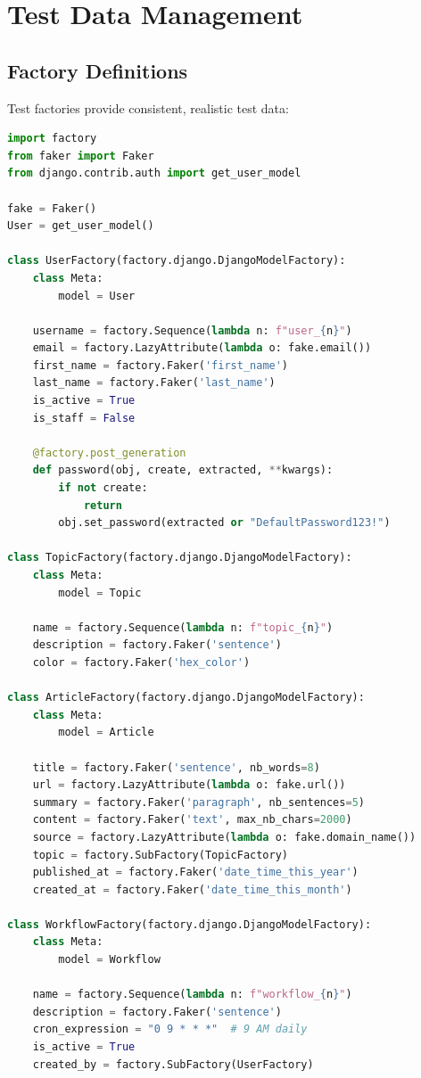 \documentclass{report}
\begin{document}
\chapter{Test Data Management}

\section{Factory Definitions}

Test factories provide consistent, realistic test data:

\begin{lstlisting}[language=Python, caption=Comprehensive factory definitions]
import factory
from faker import Faker
from django.contrib.auth import get_user_model

fake = Faker()
User = get_user_model()

class UserFactory(factory.django.DjangoModelFactory):
    class Meta:
        model = User
    
    username = factory.Sequence(lambda n: f"user_{n}")
    email = factory.LazyAttribute(lambda o: fake.email())
    first_name = factory.Faker('first_name')
    last_name = factory.Faker('last_name')
    is_active = True
    is_staff = False
    
    @factory.post_generation
    def password(obj, create, extracted, **kwargs):
        if not create:
            return
        obj.set_password(extracted or "DefaultPassword123!")

class TopicFactory(factory.django.DjangoModelFactory):
    class Meta:
        model = Topic
    
    name = factory.Sequence(lambda n: f"topic_{n}")
    description = factory.Faker('sentence')
    color = factory.Faker('hex_color')

class ArticleFactory(factory.django.DjangoModelFactory):
    class Meta:
        model = Article
    
    title = factory.Faker('sentence', nb_words=8)
    url = factory.LazyAttribute(lambda o: fake.url())
    summary = factory.Faker('paragraph', nb_sentences=5)
    content = factory.Faker('text', max_nb_chars=2000)
    source = factory.LazyAttribute(lambda o: fake.domain_name())
    topic = factory.SubFactory(TopicFactory)
    published_at = factory.Faker('date_time_this_year')
    created_at = factory.Faker('date_time_this_month')

class WorkflowFactory(factory.django.DjangoModelFactory):
    class Meta:
        model = Workflow
    
    name = factory.Sequence(lambda n: f"workflow_{n}")
    description = factory.Faker('sentence')
    cron_expression = "0 9 * * *"  # 9 AM daily
    is_active = True
    created_by = factory.SubFactory(UserFactory)
\end{lstlisting}
\end{document}
